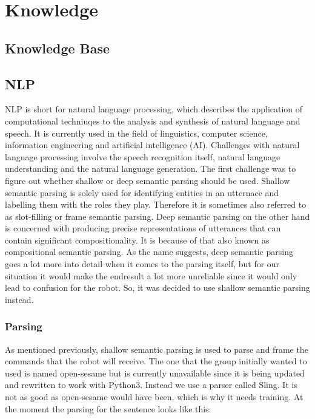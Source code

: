 \documentclass[main.tex]{subfiles}
\begin{document}
	
	\chapter{Knowledge}
	
	\section{Knowledge Base}
	
	\section{NLP}
	NLP is short for natural language processing, which describes the application of computational techniuqes to the analysis and synthesis of natural language and speech. It is currently used in the field of linguistics, computer science, information engineering and artificial intelligence (AI). Challenges with natural language processing involve the speech recognition itself, natural language understanding and the natural language generation. 
The first challenge was to figure out whether shallow or deep semantic parsing should be used. Shallow semantic parsing is solely used for identifying entities in an utternace and labelling them with the roles they play. Therefore it is sometimes also referred to as slot-filling or frame semantic parsing. Deep semantic parsing on the other hand is concerned with producing precise representations of utterances that can contain significant compositionality. It is because of that also known as compositional semantic parsing. 
As the name suggests, deep semantic parsing goes a lot more into detail when it comes to the parsing itself, but for our situation it would make the endresult a lot more unreliable since it would only lead to confusion for the robot. So, it was decided to use shallow semantic parsing instead.

\subsection{Parsing}
As mentioned previously, shallow semantic parsing is used to parse and frame the commands that the robot will receive. The one that the group initially wanted to used is named open-sesame but is currently unavailable since it is being updated and rewritten to work with Python3. Instead we use a parser called Sling. It is not as good as open-sesame would have been, which is why it needs training. 
At the moment the parsing for the sentence looks like this:
\end{document}

